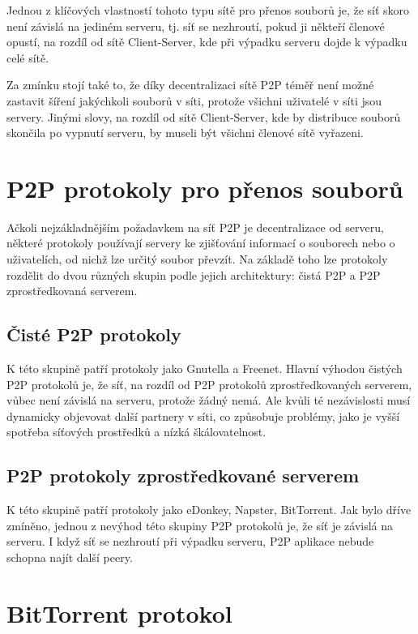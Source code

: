 \documentclass[10pt,twoside,czech,a4paper]{article}
\begin{document}
Jednou z klíčových vlastností tohoto typu sítě pro přenos souborů je, že síť skoro není závislá na jediném serveru, tj. síť se nezhroutí, pokud ji někteří členové opustí, na rozdíl od sítě Client-Server, kde při výpadku serveru dojde k výpadku celé sítě.

Za zmínku stojí také to, že díky decentralizaci sítě P2P téměř není možné zastavit šíření jakýchkoli souborů v síti, protože všichni uživatelé v síti jsou servery.
Jinými slovy, na rozdíl od sítě Client-Server, kde by distribuce souborů skončila po vypnutí serveru, by museli být všichni členové sítě vyřazeni.


\section{P2P protokoly pro přenos souborů}

Ačkoli nejzákladnějším požadavkem na síť P2P je decentralizace od serveru, některé protokoly používají servery ke zjišťování informací o souborech nebo o uživatelích, od nichž lze určitý soubor převzít.
Na základě toho lze protokoly rozdělit do dvou různých skupin podle jejich architektury: čistá P2P a P2P zprostředkovaná serverem\cite{Lui2002}.

\subsection{Čisté P2P protokoly}

K této skupině patří protokoly jako Gnutella a Freenet.
Hlavní výhodou čistých P2P protokolů je, že síť, na rozdíl od P2P protokolů zprostředkovaných serverem, vůbec není závislá na serveru, protože žádný nemá.
Ale kvůli té nezávislosti musí dynamicky objevovat další partnery v síti, co způsobuje problémy, jako je vyšší spotřeba síťových prostředků a nízká škálovatelnost\cite{Lui2002}.

\subsection{P2P protokoly zprostředkované serverem}

K této skupině patří protokoly jako eDonkey, Napster, BitTorrent.
Jak bylo dříve zmíněno, jednou z nevýhod této skupiny P2P protokolů je, že síť je závislá na serveru.
I když síť se nezhroutí při výpadku serveru, P2P aplikace nebude schopna najít další peery\cite{Lui2002}.


\section{BitTorrent protokol}
\end{document}
